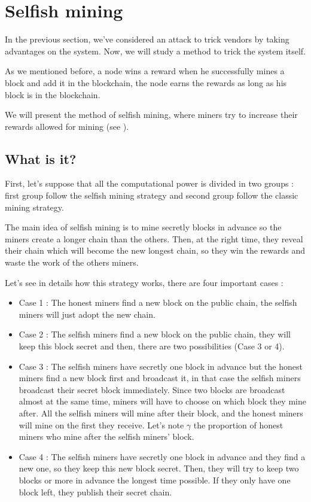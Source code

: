 \section{Selfish mining}

In the previous section, we've considered an attack to trick vendors by taking advantages on the system. Now, we will study a method to trick the system itself.

As we mentioned before, a node wins a reward when he successfully mines a block and add it in the blockchain, the node earns the rewards as long as his block is in the blockchain. \newline

We will present the method of selfish mining, where miners try to increase their rewards allowed for mining (see \cite{majority_not_enough}).

  \subsection{What is it?}

First, let's suppose that all the computational power is divided in two groups : first group follow the selfish mining strategy and second group follow the classic mining strategy. \newline

The main idea of selfish mining is to mine secretly blocks in advance so the miners create a longer chain than the others. Then, at the right time, they reveal their chain which will become the new longest chain, so they win the rewards and waste the work of the others miners. \newline

Let's see in details how this strategy works, there are four important cases : \newline

\begin{itemize}
  \item Case 1 : The honest miners find a new block on the public chain, the selfish miners will just adopt the new chain.
  \item Case 2 : The selfish miners find a new block on the public chain, they will keep this block secret and then, there are two possibilities (Case 3 or 4).
  \item Case 3 : The selfish miners have secretly one block in advance but the honest miners find a new block first and broadcast it, in that case the selfish miners broadcast their secret block immediately. Since two blocks are broadcast almost at the same time, miners will have to choose on which block they mine after. All the selfish miners will mine after their block, and the honest miners will mine on the first they receive. Let's note $\gamma$ the proportion of honest miners who mine after the selfish miners' block.
  \item Case 4 : The selfish miners have secretly one block in advance and they find a new one, so they keep this new block secret. Then, they will try to keep two blocks or more in advance the longest time possible. If they only have one block left, they publish their secret chain.
\end{itemize}
\medskip

